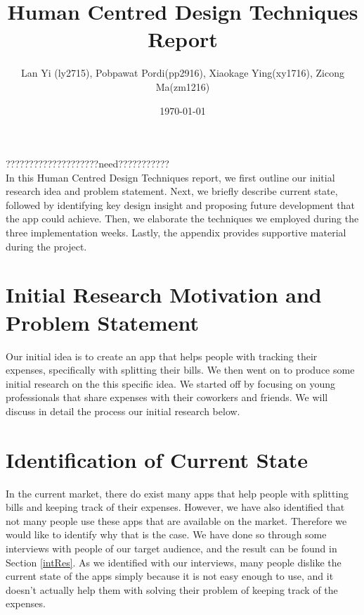 \documentclass[a4wide, 11pt]{article}
\begin{document}
\title{Human Centred Design Techniques Report}

\author{Lan Yi (ly2715), Pobpawat Pordi(pp2916), Xiaokage Ying(xy1716), Zicong Ma(zm1216)}

\date{\today}         %

\maketitle            %

\abstract
????????????????????need???????????
\\In this Human Centred Design Techniques report, we first outline our initial research idea and problem statement. Next, we briefly describe current state, followed by identifying key design insight and proposing future development that the app could achieve. Then, we elaborate the techniques we employed during the three implementation weeks. Lastly, the appendix provides supportive material during the project. 

\section{Initial Research Motivation and Problem Statement} 


Our initial idea is to create an app that helps people with tracking their expenses, specifically with splitting their bills. We then went on to produce some initial research on the this specific idea. We started off by focusing on young professionals that share expenses with their coworkers and friends. We will discuss in detail the process our initial research below.

\section{Identification of Current State}

In the current market, there do exist many apps that help people with splitting bills and keeping track of their expenses. However, we have also identified that not many people use these apps that are available on the market. Therefore we would like to identify why that is the case. We have done so through some interviews with people of our target audience, and the result can be found in Section \ref{intRes}. As we identified with our interviews, many people dislike the current state of the apps simply because it is not easy enough to use, and it doesn't actually help them with solving their problem of keeping track of the expenses.
\end{document}
